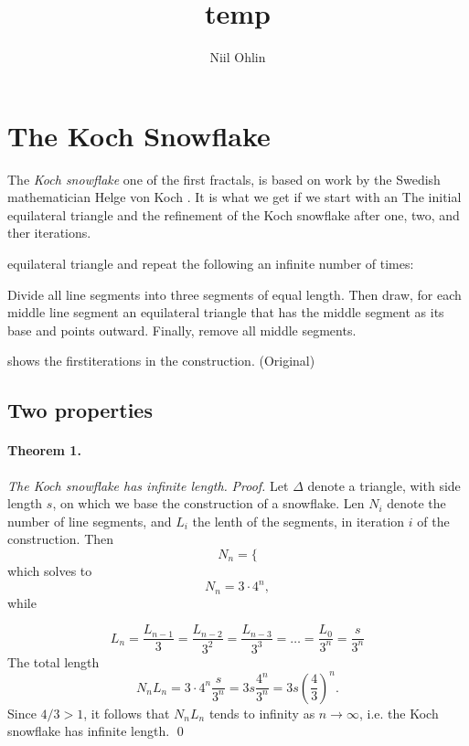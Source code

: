\documentclass{article}
\begin{document}
\title{temp}
\author{Niil Ohlin}
\date{}
\maketitle

\section{The Koch Snowflake}
The \emph{Koch snowflake} one of the first fractals, is based on work by the
Swedish mathematician Helge von Koch \label{koch}. It is what we get if we
start with an 
The initial equilateral triangle and the refinement of the Koch snowflake
after one, two, and ther iterations.

equilateral triangle and repeat the following an infinite number of times:

Divide all line segments into three segments of equal length. Then draw,
for each middle line segment an equilateral triangle that has the middle
segment as its base and points outward. Finally, remove all middle segments.

shows the firstiterations in the construction. (Original)
\subsection{Two properties}
\paragraph{Theorem 1.} \emph{The Koch snowflake has infinite length.}
\emph{Proof.} Let $\Delta$ denote a triangle, with side length $s$, on which
we base the construction of a snowflake. Len $N_i$ denote the number of line
segments, and $L_i$ the lenth of the segments, in iteration $i$ of the construction. 
Then
$$
	N_n = \{
$$
which solves to
\begin{equation}
	N_n = 3 \cdot 4^n,
\end{equation}
while
\newcommand{\uberfrac}[1]{
	= \frac {L_{n - #1}} {3^#1}
}

\begin{equation}
	L_n = \frac {L_{n-1}} {3} \uberfrac{2} \uberfrac{3} = \ldots = 
		\frac{L_0} {3^n} = \frac s {3^n}
\end{equation}
The total length
$$
	N_nL_n = 3 \cdot 4^n \frac s {3^n} = 3s \frac {4^n} {3^n} = 3s \left (
		\frac 4 3
	\right )^n.
$$
Since $4 / 3 > 1$, it follows that $N_nL_n$ tends to infinity as
$n \to \infty$, i.e. the Koch snowflake has infinite length. 
\hfill \qed
\end{document}
